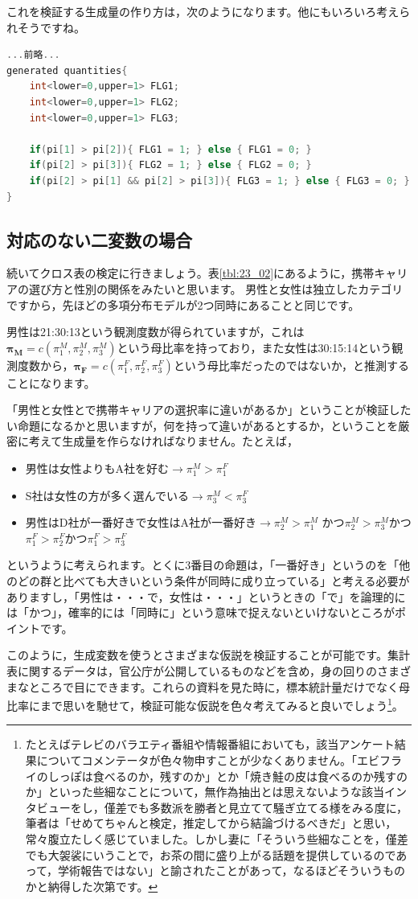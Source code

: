\documentclass{ltjsbook}
\begin{document}
これを検証する生成量の作り方は，次のようになります。他にもいろいろ考えられそうですね。
\begin{lstlisting}[language=C++,label={stan::23_02},caption={多項分布からのデータ生成モデル}]
...前略...
generated quantities{
    int<lower=0,upper=1> FLG1;
    int<lower=0,upper=1> FLG2;
    int<lower=0,upper=1> FLG3;
    
    if(pi[1] > pi[2]){ FLG1 = 1; } else { FLG1 = 0; }
    if(pi[2] > pi[3]){ FLG2 = 1; } else { FLG2 = 0; }
    if(pi[2] > pi[1] && pi[2] > pi[3]){ FLG3 = 1; } else { FLG3 = 0; }
}
\end{lstlisting}
\subsection{対応のない二変数の場合}
続いてクロス表の検定に行きましょう。表\ref{tbl:23_02}にあるように，携帯キャリアの選び方と性別の関係をみたいと思います。
男性と女性は独立したカテゴリですから，先ほどの多項分布モデルが2つ同時にあることと同じです。

男性は21:30:13という観測度数が得られていますが，これは$\bm{\pi_M} = c(\pi_1^M,\pi_2^M,\pi_3^M)$という母比率を持っており，また女性は30:15:14という観測度数から，$\bm{\pi_F} = c(\pi_1^F,\pi_2^F,\pi_3^F)$という母比率だったのではないか，と推測することになります。

「男性と女性とで携帯キャリアの選択率に違いがあるか」ということが検証したい命題になるかと思いますが，何を持って違いがあるとするか，ということを厳密に考えて生成量を作らなければなりません。たとえば，
\begin{itemize}
	\item 男性は女性よりもA社を好む$\to \pi_1^M > \pi_1^F$
	\item S社は女性の方が多く選んでいる$\to \pi_3^M < \pi_3^F$
	\item 男性はD社が一番好きで女性はA社が一番好き$\to \pi_2^M > \pi_1^M$ かつ$\pi_2^M > \pi_3^M$かつ$\pi_1^F > \pi_2^F $かつ$ \pi_1^F > \pi_3^F$
\end{itemize}
というように考えられます。とくに3番目の命題は，「一番好き」というのを「他のどの群と比べても大きいという条件が同時に成り立っている」と考える必要がありますし，「男性は・・・で，女性は・・・」というときの「で」を論理的には「かつ」，確率的には「同時に」という意味で捉えないといけないところがポイントです。

このように，生成変数を使うとさまざまな仮説を検証することが可能です。集計表に関するデータは，官公庁が公開しているものなどを含め，身の回りのさまざまなところで目にできます。これらの資料を見た時に，標本統計量だけでなく母比率にまで思いを馳せて，検証可能な仮説を色々考えてみると良いでしょう\footnote{たとえばテレビのバラエティ番組や情報番組においても，該当アンケート結果についてコメンテータが色々物申すことが少なくありません。「エビフライのしっぽは食べるのか，残すのか」とか「焼き鮭の皮は食べるのか残すのか」といった些細なことについて，無作為抽出とは思えないような該当インタビューをし，僅差でも多数派を勝者と見立てて騒ぎ立てる様をみる度に，筆者は「せめてちゃんと検定，推定してから結論づけるべきだ」と思い，常々腹立たしく感じていました。しかし妻に「そういう些細なことを，僅差でも大袈裟にいうことで，お茶の間に盛り上がる話題を提供しているのであって，学術報告ではない」と諭されたことがあって，なるほどそういうものかと納得した次第です。}。
\end{document}
